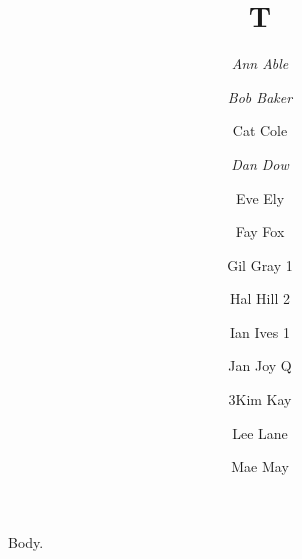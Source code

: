 \documentclass{article}
\newcommand\lxaff{\small\itshape}
\newcommand\lxsel{\fontsize{9}{11}\selectfont}
\newcommand\lxmix{\small\def\zz{Q}}
\begin{document}
\title{T}
\author{\small\itshape Ann Able
\and {\footnotesize\slshape Bob Baker}
\and {\small\selectfont Cat Cole}
\and {\lxaff Dan Dow}
\and {\lxsel Eve Ely}
\and {\normalsize Fay Fox}
\and \def\f@ox{1}Gil Gray \f@ox
\and \newcommand\f@oo{2}Hal Hill \f@oo
\and \def\myf@size{1}Ian Ives \myf@size
\and \lxmix Jan Joy \zz
\and \expandafter\def\csname a/b/c/d\endcsname{3}Kim Kay \csname a/b/c/d\endcsname
\and \newcount\nn Lee Lane
\and \newsavebox\bb Mae May}
\maketitle
Body.
\end{document}
